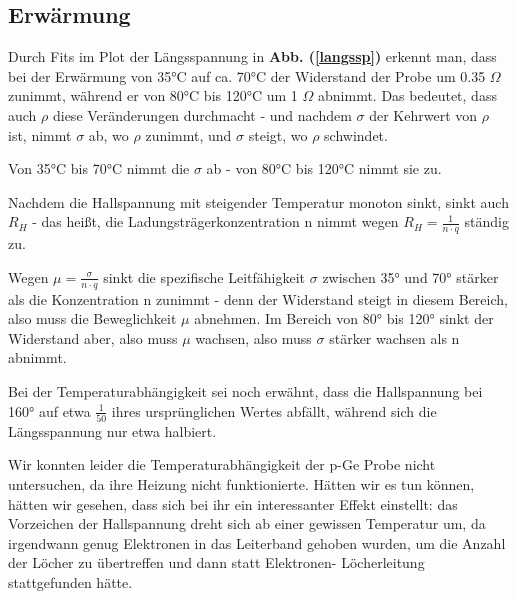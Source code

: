 \documentclass[12pt,a4paper,twopage]{article}
\begin{document}
\subsection*{Erwärmung}
Durch Fits im Plot der Längsspannung in \textbf{Abb. (\ref{langssp})} erkennt man, dass bei der Erwärmung von 35°C auf ca. 70°C der Widerstand der Probe um 0.35 $\Omega$ zunimmt, während er von 80°C bis 120°C um 1 $\Omega$ abnimmt. Das bedeutet, dass auch $\rho$ diese Veränderungen durchmacht - und nachdem $\sigma$ der Kehrwert von $\rho$ ist, nimmt $\sigma$ ab, wo $\rho$ zunimmt, und $\sigma$ steigt, wo $\rho$ schwindet.

Von 35°C bis 70°C nimmt die $\sigma$ ab - von 80°C bis 120°C nimmt sie zu.

Nachdem die Hallspannung mit steigender Temperatur monoton sinkt, sinkt auch $R_H$ - das heißt, die Ladungsträgerkonzentration n nimmt wegen $R_H=\frac{1}{n\cdot q}$ ständig zu. 

Wegen $\mu= \frac{\sigma}{n\cdot q}$ sinkt die spezifische Leitfähigkeit $\sigma$ zwischen 35° und 70° stärker als die Konzentration n zunimmt - denn der Widerstand steigt in diesem Bereich, also muss die Beweglichkeit $\mu$ abnehmen. Im Bereich von 80° bis 120° sinkt der Widerstand aber, also muss $\mu$ wachsen, also muss $\sigma$ stärker wachsen als n abnimmt. 


Bei der Temperaturabhängigkeit sei noch erwähnt, dass die Hallspannung bei 160° auf etwa $\frac{1}{50}$ ihres ursprünglichen Wertes abfällt, während sich die Längsspannung nur etwa halbiert.

Wir konnten leider die Temperaturabhängigkeit der p-Ge Probe nicht untersuchen, da ihre Heizung nicht funktionierte. Hätten wir es tun können, hätten wir gesehen, dass sich bei ihr ein interessanter Effekt einstellt: das Vorzeichen der Hallspannung dreht sich ab einer gewissen Temperatur um, da irgendwann genug Elektronen in das Leiterband gehoben wurden, um die Anzahl der Löcher zu übertreffen und dann statt Elektronen- Löcherleitung stattgefunden hätte.


																								
\end{document}
